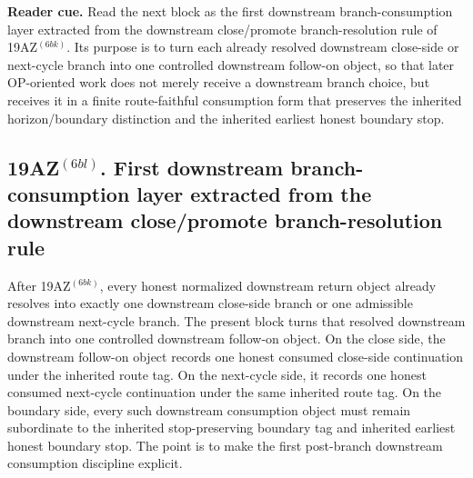 \noindent\textbf{Reader cue.} Read the next block as the first downstream branch-consumption layer extracted from the downstream close/promote branch-resolution rule of 19AZ$^{(6bk)}$. Its purpose is to turn each already resolved downstream close-side or next-cycle branch into one controlled downstream follow-on object, so that later OP-oriented work does not merely receive a downstream branch choice, but receives it in a finite route-faithful consumption form that preserves the inherited horizon/boundary distinction and the inherited earliest honest boundary stop.

\subsection*{19AZ$^{(6bl)}$. First downstream branch-consumption layer extracted from the downstream close/promote branch-resolution rule}
\label{sec:first-downstream-branch-consumption-layer-extracted-from-the-downstream-close-promote-branch-resolution-rule}
After 19AZ$^{(6bk)}$, every honest normalized downstream return object already resolves into exactly one downstream close-side branch or one admissible downstream next-cycle branch. The present block turns that resolved downstream branch into one controlled downstream follow-on object. On the close side, the downstream follow-on object records one honest consumed close-side continuation under the inherited route tag. On the next-cycle side, it records one honest consumed next-cycle continuation under the same inherited route tag. On the boundary side, every such downstream consumption object must remain subordinate to the inherited stop-preserving boundary tag and inherited earliest honest boundary stop. The point is to make the first post-branch downstream consumption discipline explicit.

